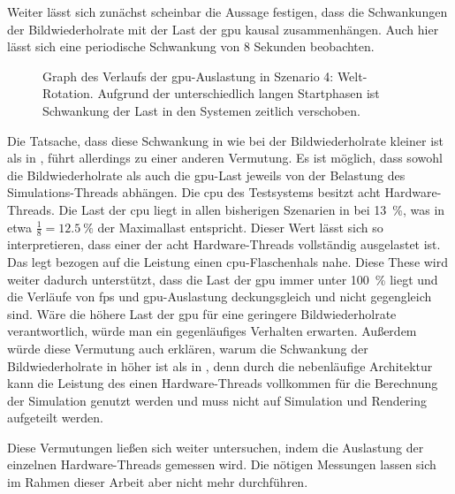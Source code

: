 Weiter lässt sich zunächst scheinbar die Aussage festigen, dass die Schwankungen der Bildwiederholrate mit der Last der \ac{gpu} kausal zusammenhängen. Auch hier lässt sich eine periodische Schwankung von 8 Sekunden beobachten. 
\begin{figure}[!htbp]
	\caption[Graph des Verlaufs der -Auslastung in Szenario 4: Welt-Rotation.]{Graph des Verlaufs der \ac{gpu}-Auslastung in Szenario 4: Welt-Rotation. Aufgrund der unterschiedlich langen Startphasen ist Schwankung der Last in den Systemen zeitlich verschoben.}\label{fig:seed-0-rotate-gpu}
\end{figure}
Die Tatsache, dass diese Schwankung in \sysA{} wie bei der Bildwiederholrate kleiner ist als in \sysB{}, führt allerdings zu einer anderen Vermutung. Es ist möglich, dass sowohl die Bildwiederholrate als auch die \ac{gpu}-Last jeweils von der Belastung des Simulations-Threads abhängen. Die \ac{cpu} des Testsystems besitzt acht Hardware-Threads. Die Last der \ac{cpu} liegt in allen bisherigen Szenarien in \sysA{} bei \SI{13}{\percent}, was in etwa $\frac{1}{8} = \SI{12,5}{\percent}$ der Maximallast entspricht. Dieser Wert lässt sich so interpretieren, dass einer der acht Hardware-Threads vollständig ausgelastet ist. Das legt bezogen auf die Leistung einen \ac{cpu}-Flaschenhals nahe. Diese These wird weiter dadurch unterstützt, dass die Last der \ac{gpu} immer unter \SI{100}{\percent} liegt und die Verläufe von \ac{fps} und \ac{gpu}-Auslastung deckungsgleich und nicht gegengleich sind. Wäre die höhere Last der \ac{gpu} für eine geringere Bildwiederholrate verantwortlich, würde man ein gegenläufiges Verhalten erwarten. Außerdem würde diese Vermutung auch erklären, warum die Schwankung der Bildwiederholrate in \sysB{} höher ist als in \sysA{}, denn durch die nebenläufige Architektur kann die Leistung des einen Hardware-Threads vollkommen für die Berechnung der Simulation genutzt werden und muss nicht auf Simulation und Rendering aufgeteilt werden.

Diese Vermutungen ließen sich weiter untersuchen, indem die Auslastung der einzelnen Hardware-Threads gemessen wird. Die nötigen Messungen lassen sich im Rahmen dieser Arbeit aber nicht mehr durchführen. 

